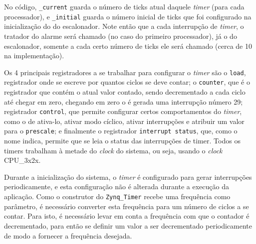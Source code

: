 No código, \verb+_current+ guarda o número de ticks atual daquele \emph{timer} (para cada processador), e \verb+_initial+ guarda o número inicial de ticks que foi configurado na inicialização do do escalonador. Note então que a cada interrupção de \emph{timer}, o tratador do alarme será chamado (no caso do primeiro processador), já o do escalonador, somente a cada certo número de ticks ele será chamado (cerca de 10 na implementação).

Os 4 principais registradores a se trabalhar para configurar o \emph{timer} são o \verb+load+, registrador onde se escreve por quantos ciclos se deve contar; o \verb+counter+, que é o registrador que contém o atual valor contado, sendo decrementado a cada ciclo até chegar em zero, chegando em zero o é gerada uma interrupção número 29; registrador \verb+control+, que permite configurar certos comportamentos do \emph{timer}, como o de ativa-lo, ativar modo cíclico, ativar interrupções e atribuir um valor para o \verb+prescale+; e finalmente o registrador \verb+interrupt status+, que, como o nome indica, permite que se leia o status das interrupções de timer. Todos os timers trabalham à metade do \emph{clock} do sistema, ou seja, usando o \emph{clock} CPU\_3x2x.

Durante a inicialização do sistema, o \emph{timer} é configurado para gerar interrupções periodicamente, e esta configuração não é alterada durante a execução da aplicação. Como o construtor do \verb+Zynq_Timer+ recebe uma frequência como parâmetro, é necessário converter esta frequência para um número de ciclos a se contar. Para isto, é necessário levar em conta a frequência com que o contador é decrementado, para então se definir um valor a ser decrementado periodicamente de modo a fornecer a frequência desejada.

